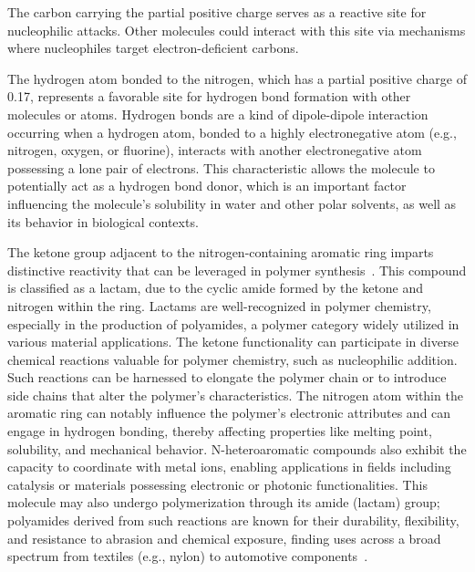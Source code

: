 The carbon carrying the partial positive charge serves as a reactive site for nucleophilic attacks. Other molecules could interact with this site via mechanisms where nucleophiles target electron-deficient carbons.

The hydrogen atom bonded to the nitrogen, which has a partial positive charge of 0.17, represents a favorable site for hydrogen bond formation with other molecules or atoms. Hydrogen bonds are a kind of dipole-dipole interaction occurring when a hydrogen atom, bonded to a highly electronegative atom (e.g., nitrogen, oxygen, or fluorine), interacts with another electronegative atom possessing a lone pair of electrons. This characteristic allows the molecule to potentially act as a hydrogen bond donor, which is an important factor influencing the molecule’s solubility in water and other polar solvents, as well as its behavior in biological contexts.

The ketone group adjacent to the nitrogen-containing aromatic ring imparts distinctive reactivity that can be leveraged in polymer synthesis~\cite{McQuarrieSimonPhysicalChemistry,CareySundbergAdvancedOrganicChemistry,Varghese2022BeyondApplications,Varghese2022BeyondApplications}. This compound is classified as a lactam, due to the cyclic amide formed by the ketone and nitrogen within the ring. Lactams are well-recognized in polymer chemistry, especially in the production of polyamides, a polymer category widely utilized in various material applications. The ketone functionality can participate in diverse chemical reactions valuable for polymer chemistry, such as nucleophilic addition. Such reactions can be harnessed to elongate the polymer chain or to introduce side chains that alter the polymer’s characteristics. The nitrogen atom within the aromatic ring can notably influence the polymer’s electronic attributes and can engage in hydrogen bonding, thereby affecting properties like melting point, solubility, and mechanical behavior. N-heteroaromatic compounds also exhibit the capacity to coordinate with metal ions, enabling applications in fields including catalysis or materials possessing electronic or photonic functionalities. This molecule may also undergo polymerization through its amide (lactam) group; polyamides derived from such reactions are known for their durability, flexibility, and resistance to abrasion and chemical exposure, finding uses across a broad spectrum from textiles (e.g., nylon) to automotive components~\cite{Varghese2022BeyondApplications,Varghese2022BeyondApplications}.

